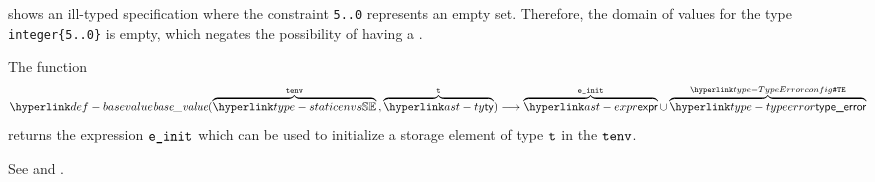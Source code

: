  shows an ill-typed specification
where the constraint \verb|5..0| represents an empty set.
Therefore, the domain of values for the type \verb|integer{5..0}| is empty,
which negates the possibility of having a \basevalueterm.

\hypertarget{def-basevalue}{}
The function
\[
\basevalue(\overname{\staticenvs}{\tenv} \aslsep \overname{\ty}{\vt}) \aslto
\overname{\expr}{\veinit} \cup \overname{\typeerror}{\TypeErrorConfig}
\]
returns the expression $\texttt{e\_init}$ which can be used to initialize a storage element
of type $\texttt{t}$ in the \staticenvironmentterm{} $\texttt{tenv}$.
\ProseOtherwiseTypeError

See  and .


